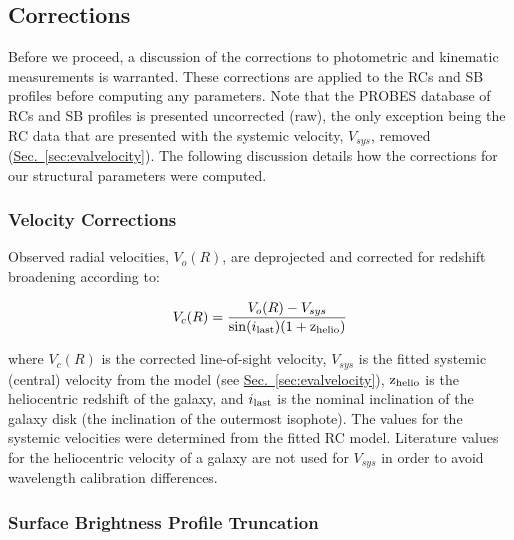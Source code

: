 \documentclass[twocolumn]{aastex631}
\newcommand{\Sec}[1]{{\protect\hyperref[sec:#1]{Sec.~\ref*{sec:#1}}}}
\begin{document}
\subsection{Corrections}\label{sec:paramcorrections}

Before we proceed, a discussion of the corrections to photometric and kinematic measurements is warranted. 
These corrections are applied to the RCs and SB profiles before computing any parameters.
Note that the PROBES database of RCs and SB profiles is presented uncorrected (raw),
the only exception being the RC data that are presented with the systemic velocity, $V_{sys}$, removed (\Sec{evalvelocity}).
The following discussion details how the corrections for our structural parameters were computed.

\subsubsection{Velocity Corrections}\label{sec:velocitycorrection}

Observed radial velocities, $V_o(R)$, are deprojected and corrected for redshift broadening according to: 

\begin{equation}
    V_c(R) = \frac{V_o(R) - V_{sys}}{\sin(i_{\rm last})(1+{\rm z}_{\rm helio})}
\end{equation}

where $V_{c}(R)$ is the corrected line-of-sight velocity, $V_{sys}$ is the fitted systemic (central) velocity from the  model (see \Sec{evalvelocity}), ${\rm z}_{\rm helio}$ is the heliocentric redshift of the galaxy, and $i_{\rm last}$ is the nominal inclination of the galaxy disk (the inclination of the outermost isophote).
The values for the systemic velocities were determined from the fitted RC model. 
Literature values for the heliocentric velocity of a galaxy are not used for $V_{sys}$ in order to avoid wavelength calibration differences.

\subsubsection{Surface Brightness Profile Truncation}\label{sec:profiletruncation}
\end{document}

